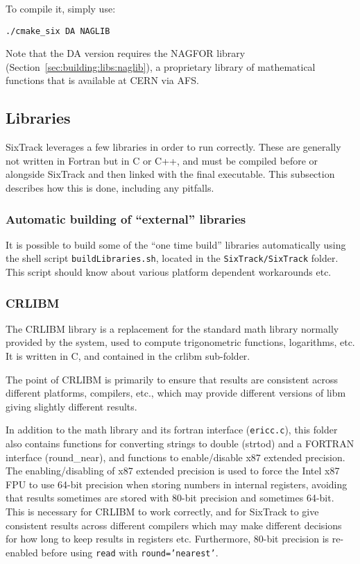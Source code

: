 \documentclass[english,BCOR=0mm,DIV=18]{scrartcl}
\begin{document}
To compile it, simply use:
\begin{lstlisting}
./cmake_six DA NAGLIB
\end{lstlisting}
Note that the DA version requires the NAGFOR library (Section~\ref{sec:building:libs:naglib}), a proprietary library of mathematical functions that is available at CERN via AFS.

\subsection{Libraries}
SixTrack leverages a few libraries in order to run correctly.
These are generally not written in Fortran but in C or C++, and must be compiled before or alongside SixTrack and then linked with the final executable.
This subsection describes how this is done, including any pitfalls.

\subsubsection{Automatic building of ``external'' libraries}
\label{sec:building:libs:automatic}

It is possible to build some of the ``one time build'' libraries automatically using the shell script \texttt{buildLibraries.sh}, located in the \texttt{SixTrack/SixTrack} folder.
This script should know about various platform dependent workarounds etc.

\subsubsection{CRLIBM}
\label{sec:building:libs:crlibm}
The CRLIBM library  is a replacement for the standard math library normally provided by the system, used to compute trigonometric functions, logarithms, etc.
It is written in C, and contained in the \textrm{crlibm} sub-folder.

The point of CRLIBM is primarily to ensure that results are consistent across different platforms, compilers, etc., which may provide different versions of libm giving slightly different results.

In addition to the math library and its fortran interface (\texttt{ericc.c}), this folder also contains functions for converting strings to double (\textrm{strtod}) and a FORTRAN interface (\textrm{round\_near}), and functions to enable/disable x87 extended precision.
The enabling/disabling of x87 extended precision is used to force the Intel x87 FPU to use 64-bit precision when storing numbers in internal registers, avoiding that results sometimes are stored with 80-bit precision and sometimes 64-bit.
This is necessary for CRLIBM to work correctly, and for SixTrack to give consistent results across different compilers which may make different decisions for how long to keep results in registers etc.
Furthermore, 80-bit precision is re-enabled before using \texttt{read} with \texttt{round='nearest'}.
\end{document}
